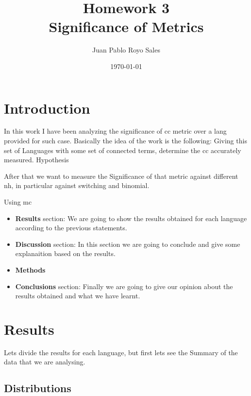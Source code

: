 \documentclass[12pt, a4paper]{article}
\title{%
      Homework 3\\
      Significance of Metrics\\
}
\author{Juan Pablo Royo Sales}
\affil{Universitat Politècnica de Catalunya}
\date\today
\begin{document}
\maketitle

\tableofcontents

\section{Introduction}
In this work I have been analyzing the significance of \acrfull{cc} metric over a \acrfull{lang} provided for such case.
Basically the idea of the work is the following: Giving this set of Languages with some set of connected terms, determine 
the \acrshort{cc} accurately measured. Hypothesis

After that we want to measure the Significance of that metric against different \acrshort{nh}, in particular against \acrfull{switching} and \acrfull{binomial}.

Using \acrfull{mc} 

\begin{itemize}
    \item \textbf{Results} section: We are going to show the results obtained for each language according to the previous statements.
    \item \textbf{Discussion} section: In this section we are going to conclude and give some explanaition based on the results.
    \item \textbf{Methods}
    \item \textbf{Conclusions} section: Finally we are going to give our opinion about the results obtained and what we have learnt.
\end{itemize}

\section{Results}
Lets divide the results for each language, but first lets see the Summary of the data that we are analysing.

\subsection{Distributions}
\end{document}
